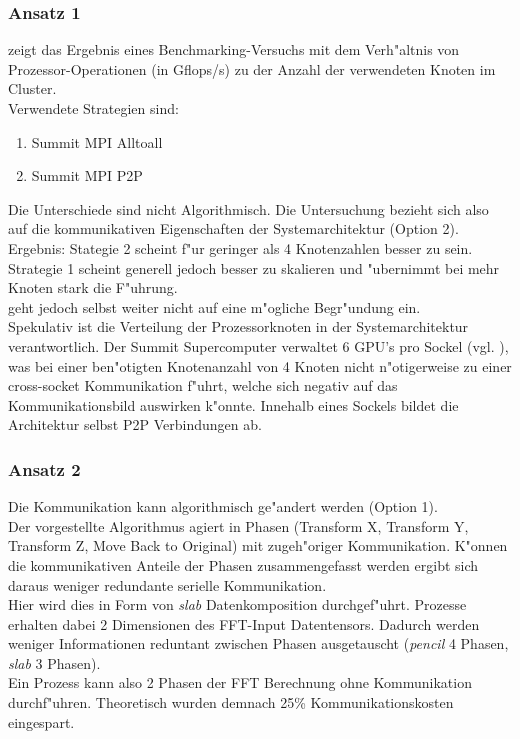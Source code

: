 \subsubsection{Ansatz 1}
\cite[Abbildung 4]{mainpaper} zeigt das Ergebnis eines Benchmarking-Versuchs mit dem Verh"altnis von Prozessor-Operationen (in Gflops/s) zu der Anzahl der verwendeten Knoten im Cluster.\\
Verwendete Strategien sind:
\begin{enumerate}
	\item Summit MPI Alltoall
	\item Summit MPI P2P
\end{enumerate}
Die Unterschiede sind nicht Algorithmisch. Die Untersuchung bezieht sich also auf die kommunikativen Eigenschaften der Systemarchitektur (Option 2).\\
Ergebnis: Stategie 2 scheint f"ur geringer als 4 Knotenzahlen besser zu sein.
Strategie 1 scheint generell jedoch besser zu skalieren und "ubernimmt bei mehr Knoten stark die F"uhrung.\\
\cite{mainpaper} geht jedoch selbst weiter nicht auf eine m"ogliche Begr"undung ein.\\
Spekulativ ist die Verteilung der Prozessorknoten in der Systemarchitektur verantwortlich. Der Summit Supercomputer verwaltet 6 GPU's pro Sockel (vgl. \cite{summit}), was bei einer ben"otigten Knotenanzahl von 4 Knoten nicht n"otigerweise zu einer cross-socket Kommunikation f"uhrt, welche sich negativ auf das Kommunikationsbild auswirken k"onnte. Innehalb eines Sockels bildet die Architektur selbst P2P Verbindungen ab.

\subsubsection{Ansatz 2}
Die Kommunikation kann algorithmisch ge"andert werden (Option 1).\\ Der vorgestellte Algorithmus agiert in Phasen (Transform X, Transform Y, Transform Z, Move Back to Original) mit zugeh"origer Kommunikation. K"onnen die kommunikativen Anteile der Phasen zusammengefasst werden ergibt sich daraus weniger redundante serielle Kommunikation.\\
Hier wird dies in Form von \textit{slab} Datenkomposition durchgef"uhrt. Prozesse erhalten dabei 2 Dimensionen des FFT-Input Datentensors. Dadurch werden weniger Informationen reduntant zwischen Phasen ausgetauscht (\textit{pencil} 4 Phasen, \textit{slab} 3 Phasen).\\
Ein Prozess kann also 2 Phasen der FFT Berechnung ohne Kommunikation durchf"uhren. Theoretisch wurden demnach 25\% Kommunikationskosten eingespart.\\

